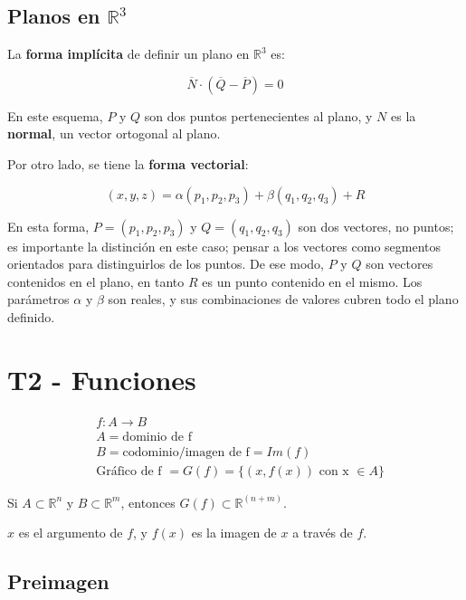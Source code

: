 \documentclass{article}
\renewcommand{\Bbb}{\mathbb}
\begin{document}
\subsection{Planos en \texorpdfstring{$\Bbb R^3$}{R3}}

La \textbf{forma implícita} de definir un plano en $\Bbb R^3$ es:

\begin{equation}
\overline{N} \cdot (\overline{Q} - \overline{P}) = 0
\end{equation}

En este esquema, $P$ y $Q$ son dos puntos pertenecientes al plano, y $N$ es la \textbf{normal}, un vector ortogonal al plano.

Por otro lado, se tiene la \textbf{forma vectorial}:

\begin{equation}
(x,y,z) = \alpha (p_1, p_2, p_3) + \beta (q_1, q_2, q_3) + R
\end{equation}

En esta forma, $P = (p_1, p_2, p_3)$ y $Q = (q_1, q_2, q_3)$ son dos vectores, no puntos; es importante la distinción en este caso; pensar a los vectores como segmentos orientados para distinguirlos de los puntos. De ese modo, $P$ y $Q$ son vectores contenidos en el plano, en tanto $R$ es un punto contenido en el mismo. Los parámetros $\alpha$ y $\beta$ son reales, y sus combinaciones de valores cubren todo el plano definido. 

\section{T2 - Funciones}

\begin{subequations}
\begin{align}
&f: A \rightarrow B \\
&A = \text{dominio de f} \\
&B = \text{codominio/imagen de f} = Im(f) \\
&\text{Gráfico de f } = G(f) = \{ (x, f(x)) \text{ con x } \in A \}
\end{align}
\end{subequations}

Si $A \subset \Bbb R^n$ y $B \subset \Bbb R^m$, entonces $G(f) \subset \Bbb R^(n+m)$.

$x$ es el argumento de $f$, y $f(x)$ es la imagen de $x$ a través de $f$.

\subsection{Preimagen}
\end{document}
